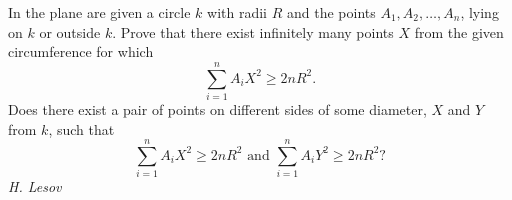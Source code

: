 In the plane are given a circle $k$ with radii $R$ and the points $A_1,A_2,\ldots,A_n$, lying on $k$ or outside $k$. Prove that there exist infinitely many points $X$ from the given circumference for which
$$\sum_{i=1}^n A_iX^2\ge2nR^2.$$Does there exist a pair of points on different sides of some diameter, $X$ and $Y$ from $k$, such that
$$\sum_{i=1}^n A_iX^2\ge2nR^2\text{ and }\sum_{i=1}^n A_iY^2\ge2nR^2?$$
\textit{H. Lesov}